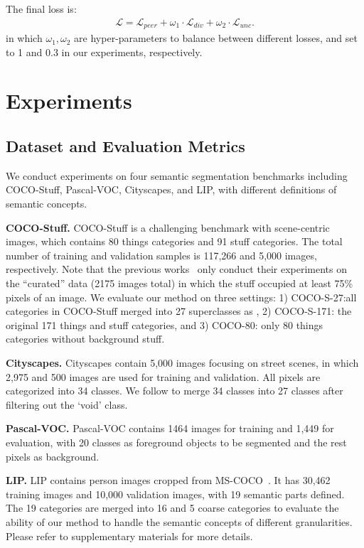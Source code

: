\documentclass[runningheads]{llncs}
\newcommand{\PAR}[1]{\smallskip \noindent \textbf{#1}}
\begin{document}
The final loss is:
\begin{align}
    \mathcal{L} = \mathcal{L}_{peer} + \omega_1 \cdot \mathcal{L}_{div} + \omega_2 \cdot \mathcal{L}_{unc}.
    \label{eq:loss:all}
\end{align}
in which $\omega_1, \omega_2$ are hyper-parameters to balance between different losses, and set to 1 and 0.3 in our experiments, respectively.

\section{Experiments}


\subsection{Dataset and Evaluation Metrics}

We conduct experiments on four semantic segmentation benchmarks including COCO-Stuff, Pascal-VOC, Cityscapes, and LIP, with different definitions of semantic concepts.

\PAR{COCO-Stuff.} COCO-Stuff is a challenging benchmark with scene-centric images, which contains 80 things categories and 91 stuff categories. The total number of training and validation samples is 117,266 and 5,000 images, respectively. Note that the previous works~\cite{PiCIE,IIC} only conduct their experiments on the ``curated'' data (2175 images total) in which the stuff occupied at least 75\% pixels of an image. We evaluate our method on three settings: 1) COCO-S-27:all categories in COCO-Stuff merged into 27 superclasses as \cite{PiCIE}, 2) COCO-S-171: the original 171 things and stuff categories, and 3) COCO-80: only 80 things categories without background stuff.

\PAR{Cityscapes.} Cityscapes contain 5,000 images focusing on street scenes, in which 2,975 and 500 images are used for training and validation. All pixels are categorized into 34 classes. We follow \cite{PiCIE} to merge 34 classes into 27 classes after filtering out the `void' class.

\PAR{Pascal-VOC.} Pascal-VOC contains 1464 images for training and 1,449 for evaluation, with 20 classes as foreground objects to be segmented and the rest pixels as background. 

\PAR{LIP.} LIP contains person images cropped from MS-COCO~\cite{lin2014mscoco}. It has 30,462 training images and 10,000 validation images, with 19 semantic parts defined. The 19 categories are merged into 16 and 5 coarse categories to evaluate the ability of our method to handle the semantic concepts of different granularities. Please refer to supplementary materials for more details.
\end{document}
